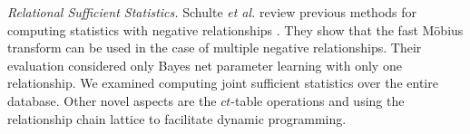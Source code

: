 \documentclass{sig-alternate-2013}
\newcommand{\ct}{\mathit{ct}}
\begin{document}
%
{\em Relational Sufficient Statistics.} 
%
Schulte {\em et al.} review previous methods for computing statistics with negative relationships \cite{Schulte2014}. They show that the fast M\"obius transform can be used in the case of multiple negative relationships. 
Their evaluation considered only Bayes net parameter learning with only one relationship. 
We examined computing joint sufficient statistics over the entire database. 
Other novel aspects are the $\ct$-table operations and using the relationship chain lattice to facilitate dynamic programming. 

\end{document}
